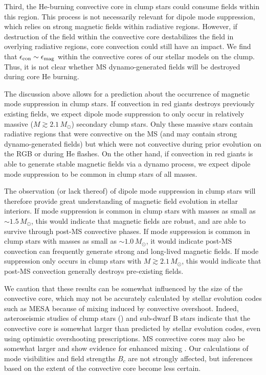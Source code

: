 Third, the He-burning convective core in clump stars could consume fields within this region. This process is not necessarily relevant for dipole mode suppression, which relies on strong magnetic fields within radiative regions. However, if destruction of the field within the convective core destabilizes the field in overlying radiative regions, core convection could still have an impact. We find that $\epsilon_{\rm con} \sim \epsilon_{\rm mag}$ within the convective cores of our stellar models on the clump. Thus, it is not clear whether MS dynamo-generated fields will be destroyed during core He burning. 

The discussion above allows for a prediction about the occurrence of magnetic mode suppression in clump stars. If convection in red giants destroys previously existing fields, we expect dipole mode suppression to only occur in relatively massive ($M \gtrsim 2.1 \, M_\odot$) secondary clump stars. Only these massive stars contain radiative regions that were convective on the MS (and may contain strong dynamo-generated fields) but which were not convective during prior evolution on the RGB or during He flashes. On the other hand, if convection in red giants is able to generate stable magnetic fields via a dynamo process, we expect dipole mode suppression to be common in clump stars of all masses.

The observation (or lack thereof) of dipole mode suppression in clump stars will therefore provide great understanding of magnetic field evolution in stellar interiors. If mode suppression is common in clump stars with masses as small as $\sim \! 1.5 \, M_\odot$, this would indicate that magnetic fields are robust, and are able to survive through post-MS convective phases. If mode suppression is common in clump stars with masses as small as $\sim \! 1.0 \, M_\odot$, it would indicate post-MS convection can frequently generate strong and long-lived magnetic fields. If mode suppression only occurs in clump stars with $M \gtrsim 2.1 \, M_\odot$, this would indicate that post-MS convection generally destroys pre-existing fields. 

We caution that these results can be somewhat influenced by the size of the convective core, which may not be accurately calculated by stellar evolution codes such as MESA  because of mixing induced by convective overshoot. Indeed, asteroseismic studies of clump stars (\cite{montalban_2013,stello_2013,mosser_2014,bossini_2015,constantino_2015}) and sub-dwarf B stars \citep{vangrootel_2010a,vangrootel_2010b,charpinet_2011,Schindler_2015} indicate that the convective core is somewhat larger than predicted by stellar evolution codes, even using optimistic overshooting prescriptions. MS convective cores may also be somewhat larger and show evidence for enhanced mixing \citep{moravveji_2015}.  Our calculations of mode visibilities and field strengths $B_c$ are not strongly affected, but inferences based on the extent of the convective core become less certain.
    
    